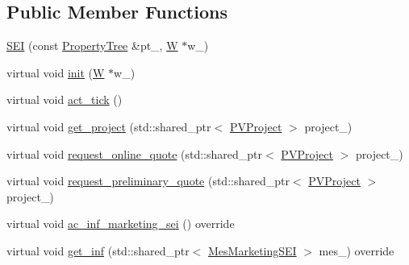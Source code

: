\subsection*{Public Member Functions}
{\bf }\par
\begin{DoxyCompactItemize}
\item 
\hyperlink{classsolar__core_1_1_s_e_i_af885d50c89decf5b6ff208c24cedd82b}{S\+E\+I} (const \hyperlink{namespacesolar__core_adeda2737d6938c190eb774a5b2495045}{Property\+Tree} \&pt\+\_\+, \hyperlink{classsolar__core_1_1_w}{W} $\ast$w\+\_\+)
\item 
virtual void \hyperlink{classsolar__core_1_1_s_e_i_aecd2436dcb77c31480dc3ef3fcda172d}{init} (\hyperlink{classsolar__core_1_1_w}{W} $\ast$w\+\_\+)
\end{DoxyCompactItemize}

{\bf }\par
\begin{DoxyCompactItemize}
\item 
virtual void \hyperlink{classsolar__core_1_1_s_e_i_ab0bd6ae650afc15fe71ce545373ab16e}{act\+\_\+tick} ()
\item 
virtual void \hyperlink{classsolar__core_1_1_s_e_i_ad3730a5f71a2932744916a5a62753c97}{get\+\_\+project} (std\+::shared\+\_\+ptr$<$ \hyperlink{classsolar__core_1_1_p_v_project}{P\+V\+Project} $>$ project\+\_\+)
\end{DoxyCompactItemize}

{\bf }\par
\begin{DoxyCompactItemize}
\item 
virtual void \hyperlink{classsolar__core_1_1_s_e_i_a704af1e2cacd1aba86d5ac406f2231ce}{request\+\_\+online\+\_\+quote} (std\+::shared\+\_\+ptr$<$ \hyperlink{classsolar__core_1_1_p_v_project}{P\+V\+Project} $>$ project\+\_\+)
\item 
virtual void \hyperlink{classsolar__core_1_1_s_e_i_aa34d9c40613ff61fc0c8c911e0734441}{request\+\_\+preliminary\+\_\+quote} (std\+::shared\+\_\+ptr$<$ \hyperlink{classsolar__core_1_1_p_v_project}{P\+V\+Project} $>$ project\+\_\+)
\item 
virtual void \hyperlink{classsolar__core_1_1_s_e_i_aa44745e1e93c45d163981751848e21e9}{ac\+\_\+inf\+\_\+marketing\+\_\+sei} () override
\item 
virtual void \hyperlink{classsolar__core_1_1_s_e_i_aefbf747021fcb1f48742b0dd3bc7757f}{get\+\_\+inf} (std\+::shared\+\_\+ptr$<$ \hyperlink{classsolar__core_1_1_mes_marketing_s_e_i}{Mes\+Marketing\+S\+E\+I} $>$ mes\+\_\+) override
\end{DoxyCompactItemize}

